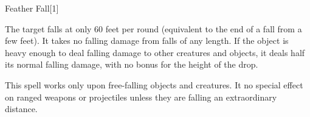 \begin{spellsection}{Feather Fall}[1]
    \begin{spellheader}
    \end{spellheader}
    \begin{spellcontent}
        \begin{spelltargetinginfo}
        \end{spelltargetinginfo}
        \begin{spelleffects}
            \spelleffect The target falls at only 60 feet per round (equivalent to the end of a fall from a few feet). It takes no falling damage from falls of any length. If the object is heavy enough to deal falling damage to other creatures and objects, it deals half its normal falling damage, with no bonus for the height of the drop.
            \spelldur \durshort
        \end{spelleffects}
    \end{spellcontent}
    \begin{spellfooter}
        \spellnotes This spell works only upon free-falling objects and creatures. It no special effect on ranged weapons or projectiles unless they are falling an extraordinary distance.
        \miscastrandom
    \end{spellfooter}
    \begin{spellaugments}
    \end{spellaugments}
\end{spellsection}


